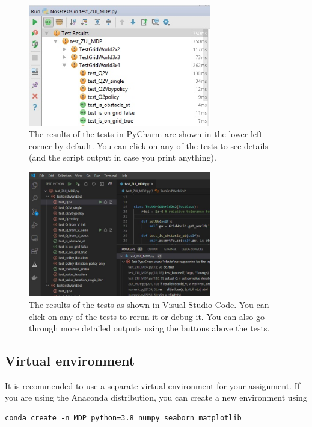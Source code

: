 \documentclass[10pt,journal,compsoc,twoside]{IEEEtran}
\begin{document}
\begin{figure}[t]
    \includegraphics[width=8cm]{figures/pycharm_nosetests_results.jpg}
    \centering
    \caption{The results of the tests in PyCharm are shown in the lower left corner by default. You can click on any of the tests to see details (and the script output in case you print anything).}
    \label{fig:nosetests_results}
\end{figure}

\begin{figure}[t]
    \includegraphics[width=8cm]{figures/vsc_results.jpg}
    \centering
    \caption{The results of the tests as shown in Visual Studio Code. You can click on any of the tests to rerun it or debug it. You can also go through more detailed outputs using the buttons above the tests.}
    \label{fig:vsc_results}
\end{figure}


\subsection{Virtual environment}
It is recommended to use a separate virtual environment for your assignment. If you are using the Anaconda distribution, you can create a new environment using

\begin{lstlisting}[language=none]
conda create -n MDP python=3.8 numpy seaborn matplotlib
\end{lstlisting}
\end{document}

